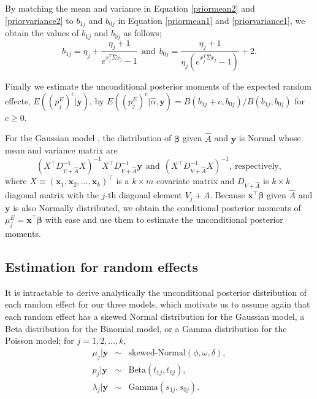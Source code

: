 \documentclass[article]{jss}
\begin{document}
By matching the  mean and variance in Equation \ref{priormean2} and \ref{priorvariance2} to $b_{1j}$ and $b_{0j}$ in Equation \ref{priormean1} and \ref{priorvariance1}, we obtain the values of $b_{1j}$ and $b_{0j}$ as follows;
\begin{equation}\label{priormeanpara}
b_{1j}=\eta_j+\frac{\eta_j + 1}{e^{x_j^{T}\hat{\Sigma} x_j}-1}~~\textrm{and}~~b_{0j}=\frac{\eta_j + 1}{\eta_j(e^{x_j^{T}\hat{\Sigma} x_j}-1)}+2.
\end{equation}

Finally we estimate the unconditional posterior moments of the expected random effects, $E((p^E_{j})^c\vert\boldsymbol{y})$, by $E((p^E_{j})^c\vert\hat{\alpha}, \boldsymbol{y})=B(b_{1j} + c, b_{0j})/B(b_{1j}, b_{0j})$ for $c\ge0$.


For the Gaussian model \citep{tang2011}, the distribution of $\boldsymbol{\beta}$ given $\hat{A}$ and $\boldsymbol{y}$ is Normal whose mean and variance matrix are
\begin{equation}
(X^\top D^{-1}_{V+\hat{A}} X)^{-1}X^\top D^{-1}_{V+\hat{A}}\boldsymbol{y}~~ \textrm{and}~~ (X^\top D^{-1}_{V+\hat{A}} X)^{-1}, ~\textrm{respectively},
\end{equation}
where $X\equiv (\boldsymbol{x}_1, \boldsymbol{x}_2, \ldots, \boldsymbol{x}_k)^\top$ is a $k \times m$ covariate matrix and $D_{V+\hat{A}}$ is $k \times k$ diagonal matrix with the $j$-th diagonal element $V_j+\hat{A}$. Because $\boldsymbol{x}^\top\boldsymbol{\beta}$ given $\hat{A}$ and $\boldsymbol{y}$ is also Normally distributed, we obtain the conditional posterior moments of $\mu^E_j=\boldsymbol{x}^\top\boldsymbol{\beta}$ with ease and use them to estimate the unconditional posterior moments.


\subsection{Estimation for random effects}
It is intractable to derive analytically the unconditional posterior distribution of each random effect  for our three models, which motivate us to assume again that each random effect has a skewed Normal distribution \cite{azzalini1985class} for the Gaussian model, a Beta distribution for the Binomial model, or a Gamma distribution for the Poisson model; for $j=1, 2, \ldots, k$,
\begin{eqnarray}
\mu_j\vert\boldsymbol{y} &\sim& \textrm{skewed-Normal}(\phi, \omega, \delta),\label{skewnormal}\\
p_j\vert \boldsymbol{y} &\sim& \textrm{Beta}(t_{1j}, t_{0j}),\label{betapost}\\
\lambda_j\vert \boldsymbol{y} &\sim& \textrm{Gamma}(s_{1j}, s_{0j}).\label{gammapost}
\end{eqnarray}
\end{document}
